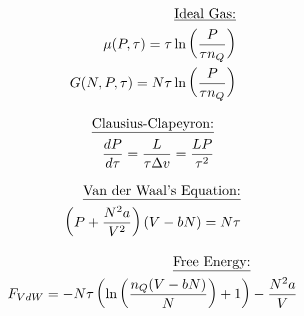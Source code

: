 \documentclass[12pt]{article}
\begin{document}
\vspace{-20pt}

\begin{multicols}{2}

  \begin{equation*}
    \begin{split}
      \text{\underline{Ideal Gas:}}\\
      \mu(P,\tau)=\tau\ln\left( \frac{P}{\tau n_Q} \right)\\
      G(N,P,\tau)=N\tau\ln\left( \frac{P}{\tau n_Q} \right)
    \end{split}
  \end{equation*}

  \begin{equation*}
    \begin{split}
      \text{\underline{Clausius-Clapeyron:}}\\
      \frac{dP}{d\tau}=\frac{L}{\tau\Delta v}=\frac{LP}{\tau^2}
    \end{split}
  \end{equation*}

\end{multicols}

\begin{multicols}{2}

  \begin{equation*}
    \begin{split}
      \text{\underline{Van der Waal's Equation:}}\\
      \left( P+\frac{N^2a}{V^2} \right)\left( V-bN \right)=N\tau
    \end{split}
  \end{equation*}

  \begin{equation*}
    \begin{split}
      \text{\underline{Free Energy:}}&\\
      F_{VdW}=-N\tau\left( \ln\left( \frac{n_Q(V-bN)}{N} \right)+1 \right)&-\frac{N^2a}{V}
    \end{split}
  \end{equation*}

\end{multicols}
\end{document}
